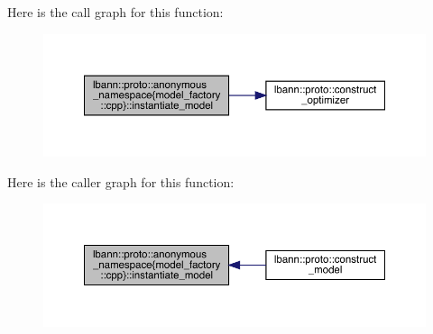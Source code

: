Here is the call graph for this function\+:\nopagebreak
\begin{figure}[H]
\begin{center}
\leavevmode
\includegraphics[width=350pt]{namespacelbann_1_1proto_1_1anonymous__namespace_02model__factory_8cpp_03_a6a08f0b26d015824ef28ddbb66b6d4c0_cgraph}
\end{center}
\end{figure}
Here is the caller graph for this function\+:\nopagebreak
\begin{figure}[H]
\begin{center}
\leavevmode
\includegraphics[width=350pt]{namespacelbann_1_1proto_1_1anonymous__namespace_02model__factory_8cpp_03_a6a08f0b26d015824ef28ddbb66b6d4c0_icgraph}
\end{center}
\end{figure}
